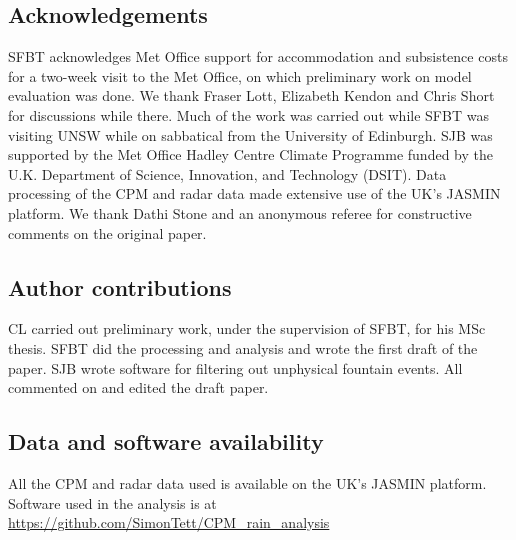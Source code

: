 \documentclass[11pt,a4paper]{article}
\begin{document}
\printbibliography %

\subsection*{Acknowledgements}
SFBT acknowledges  Met Office support for accommodation and subsistence costs for a two-week visit to the Met Office, on which preliminary work on model evaluation was done. We thank Fraser Lott,  Elizabeth Kendon and Chris Short for discussions while there. Much of the  work was carried out while SFBT was visiting UNSW while on sabbatical from the University of Edinburgh.  SJB was supported by the Met Office Hadley Centre Climate Programme funded by the U.K. Department of Science, Innovation, and Technology (DSIT). Data processing of the CPM and radar data made extensive use of the UK's JASMIN platform.  We thank Dathi Stone and an anonymous referee for constructive comments on the original paper. 

\subsection*{Author contributions}
CL carried out preliminary work, under the supervision of SFBT, for his MSc thesis. SFBT did the processing and analysis and wrote the first draft of the paper. SJB wrote software for filtering out unphysical fountain events. All commented on and edited the draft paper. 

\subsection*{Data and software availability}
All the CPM and radar data used is available on the UK's JASMIN platform. Software used in the analysis is at \url{https://github.com/SimonTett/CPM_rain_analysis}
\clearpage




\clearpage



\clearpage
\end{document}
